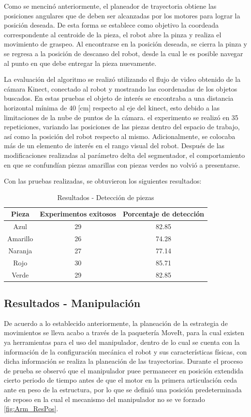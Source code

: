 Como se mencinó anteriormente, el planeador de trayectoria obtiene las posiciones angulares que de deben ser alcanzadas por los motores para lograr la posición deseada. De esta forma se establece como objetivo la coordeada correspondente al centroide de la pieza, el robot abre la pinza y realiza el movimiento de graspeo. Al encontrarse en la posición deseada, se cierra la pinza y se regresa a la posición de descanso del robot, desde la cual le es posible navegar al punto en que debe entregar la pieza nuevamente.

La evaluación del algoritmo se realizó utilizando el flujo de video obtenido de la cámara Kinect, conectado al robot y mostrando las coordenadas de los objetos buscados. En estas pruebas el objeto de interés se encontraba a una distancia horizontal mínima de 40 [cm] respecto al eje del kinect, esto debido a las limitaciones de la nube de puntos de la cámara. el experimento se realizó en 35 repeticiones, variando las posiciones de las piezas dentro del espacio de trabajo, así como la posición del robot respecto al mismo. Adicionalmente, se colocaba más de un elemento de interés en el rango visual del robot. Después de las modificaciones realizadas al parámetro delta del segmentador, el comportamiento en que se confundían piezas amarillas con piezas verdes no volvió a presentarse.

Con las pruebas realizadas, se obtuvieron los siguientes resultados:

\begin{table}
    \centering
    \begin{tabular}{|c|c|c|}
    \hline
        \textbf{Pieza} & \textbf{Experimentos exitosos} & \textbf{Porcentaje de detección}\\
    \hline
        Azul & 29 & 82.85\\
    \hline
        Amarillo & 26 & 74.28\\
    \hline
        Naranja & 27 & 77.14 \\
    \hline
        Rojo & 30 & 85.71 \\
    \hline
        Verde & 29 & 82.85 \\
    \hline
    \end{tabular}
    \caption{Resultados - Detección de piezas}
    \label{tab:Res-Vis}
\end{table}


\subsection{Resultados - Manipulación}
De acuerdo a lo establecido anteriormente, la planeación de la estrategia de movimientos se lleva acabo a través de la paquetería MoveIt, para la cual existen ya herramientas para el uso del manipulador, dentro de lo cual se cuenta con la información de la configuración mecánica el robot y sus características físicas, con dicha información se realiza la planeación de las trayectorias. Durante el proceso de prueba se observó que el manipulador puee permanecer en posición extendida cierto periodo de tiempo antes de que el motor en la primera articulación ceda ante en peso de la estructura, por lo que se definió una posición predeterminada de reposo en la cual el mecanismo del manipulador no se ve forzado \ref{fig:Arm_ResPos}.

